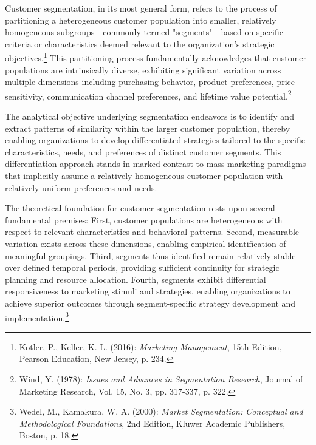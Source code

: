 \documentclass[12pt,a4paper,oneside]{report}
\begin{document}
Customer segmentation, in its most general form, refers to the process of partitioning a heterogeneous customer population into smaller, relatively homogeneous subgroups—commonly termed "segments"—based on specific criteria or characteristics deemed relevant to the organization's strategic objectives.\footnote{Kotler, P., Keller, K. L. (2016): \textit{Marketing Management}, 15th Edition, Pearson Education, New Jersey, p. 234.} This partitioning process fundamentally acknowledges that customer populations are intrinsically diverse, exhibiting significant variation across multiple dimensions including purchasing behavior, product preferences, price sensitivity, communication channel preferences, and lifetime value potential.\footnote{Wind, Y. (1978): \textit{Issues and Advances in Segmentation Research}, Journal of Marketing Research, Vol. 15, No. 3, pp. 317-337, p. 322.}

The analytical objective underlying segmentation endeavors is to identify and extract patterns of similarity within the larger customer population, thereby enabling organizations to develop differentiated strategies tailored to the specific characteristics, needs, and preferences of distinct customer segments. This differentiation approach stands in marked contrast to mass marketing paradigms that implicitly assume a relatively homogeneous customer population with relatively uniform preferences and needs.

The theoretical foundation for customer segmentation rests upon several fundamental premises: First, customer populations are heterogeneous with respect to relevant characteristics and behavioral patterns. Second, measurable variation exists across these dimensions, enabling empirical identification of meaningful groupings. Third, segments thus identified remain relatively stable over defined temporal periods, providing sufficient continuity for strategic planning and resource allocation. Fourth, segments exhibit differential responsiveness to marketing stimuli and strategies, enabling organizations to achieve superior outcomes through segment-specific strategy development and implementation.\footnote{Wedel, M., Kamakura, W. A. (2000): \textit{Market Segmentation: Conceptual and Methodological Foundations}, 2nd Edition, Kluwer Academic Publishers, Boston, p. 18.}
\end{document}
